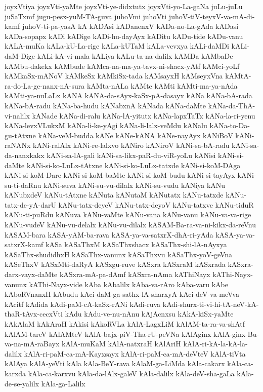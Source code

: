 {joyxVtiya
joyxVti-yaMte
joyxVti-ye-didxtutx
joyxVti-yo-La-gaNa
juLu-juLu
juSaTxmf
jugu-pesx-yuM-TA-guva
juhoVmi
juhoVti
juhoV-tiV-teyxV-va-mA-di-kamf
juhoV-ti-pa-yasA
kA
kADAsi
kADanenxV
kADa-no-La-gAda
kADasi
kADa-sopapx
kADi
kADige
kADi-hu-dayAyx
kADitu
kADu-tide
kADu-vanu
kALA-muKa
kALa-kU-La-rige
kALa-kUTaM
kALa-vevxya
kALi-daMDi
kALi-daM-Dige
kALi-kA-vi-mala
kALiya
kALu-ta-na-dalilx
kAMDa
kAMbaDe
kAMbu-dakekx
kAMbude
kAMca-na-ma-ya-tavx-ni-shacx-yAtf
kAMci-yoLf
kAMkaSx-mANoV
kAMkeSx
kAMkiSx-tada
kAMsayxH
kAMseyxVna
kAMtA-ra-do-La-ge-nanx-nA-sura
kAMta-nALa
kAMte
kAMti
kAMti-ma-ya-nAda
kAMti-ya-nuLaLx
kANA
kANA-da-sAyx-kaSx-pA-dasayx
kANa
kANa-bA-rada
kANa-bA-radu
kANa-ba-hudu
kANabxnA
kANada
kANa-daMte
kANa-da-ThA-vi-nalilx
kANade
kANa-di-ralu
kANa-lA-yitutx
kANa-lapxTaTx
kANa-la-ri-yenu
kANa-levxVLukxM
kANa-li-ke-yAgi
kANa-li-lalx-veMdu
kANalu
kANa-to-Da-gu-tAtxne
kANa-veM-budda
kANe
kANe-kANA
kANe-nayAyx
kANiBoV
kANi-raNANx
kANi-ralAlx
kANi-re-lalxvo
kANiro
kANiroV
kANi-sa-bA-radu
kANi-sa-da-nanxkakx
kANi-sa-lA-gali
kANi-sa-likx-paR-du-viR-yoLu
kANisi
kANi-si-daMte
kANi-si-ko-LuLx-tAtxne
kANi-si-ko-LuLx-tatxde
kANi-si-koM-DAga
kANi-si-koM-Dare
kANi-si-koM-baMte
kANi-si-koM-budu
kANi-si-tayAyx
kANi-su-ti-daRnu
kANi-suva
kANi-su-vu-dilalx
kANi-su-vudu
kANiya
kANu
kANubxdeV
kANu-tAtxne
kANuta
kANutaM
kANutatx
kANu-tatxde
kANu-tatx-de-yA-darU
kANu-tatx-deyeV
kANu-tatx-deyoV
kANu-tatxve
kANu-tiduR
kANu-ti-puRdu
kANuva
kANu-vaMte
kANu-vana
kANu-vanu
kANu-va-va-rige
kANu-vudeV
kANu-vu-delalx
kANu-vu-dilalx
kASAM-Ba-ra-va-ni-kikx-da-reVnu
kASAM-bara
kASA-yAM-ba-rava
kASA-ya-va-satxrX-dhA-ri-yAda
kASA-ya-va-satxrX-kamf
kASa
kASaThxM
kASaThxshacx
kASaThx-shi-lA-nAyxya
kASaThx-shudidhxH
kASaThx-vanunx
kASaThxvu
kASaThx-yoV-geVna
kASeThxV
kASxMti-daRyA
kASxgu-ruve
kASxra
kASxraM
kASxrada
kASxra-darx-vayx-daMte
kASxra-mA-pa-dAmf
kASxra-nAma
kAThiNayx
kAThi-Nayx-vanunx
kAThi-Nayx-vide
kAba
kAbalilx
kAba-va-rAro
kAba-varu
kAbe
kAboRVnanxH
kAbudu
kAci-daM-ga-sathx-lA-sharxyA
kAci-deV-va-meVva
kAcitf
kAdida
kAdi-paM-cA-kaSx-rANi
kAdi-ruva
kAdi-shurx-ti-vi-hi-tA-neV-kA-thaR-tAvx-cecxVti
kAdu
kAdu-ve-nu-nAnu
kAjAcnxsu
kAkA-kiSx-yaMte
kAkAlaM
kAkAraH
kAkisi
kAkoRVLa
kAlA-LagxLiM
kAlAM-ta-ra-va-shAtf
kAlAM-tareV
kAlAMteV
kAlA-bajx-piV-Tha-rU-peVNa
kAlAginx
kAlA-ginx-Bu-va-na-mA-raBayx
kAlA-muKaM
kAlA-natxraH
kAlAriH
kAlA-ri-kA-la-kA-la-dalilx
kAlA-ri-paM-ca-mA-Kayxsayx
kAlA-ri-paM-ca-mA-deVteV
kAlA-tiVta
kAlAya
kAlA-yeVti
kAla
kAla-BeY-rava
kAlaM-ga-LiMda
kAla-cakarx
kAla-ca-karxda
kAla-ca-karxvu
kAla-da-lAlx-galeV
kAla-dalilx
kAla-deV-sha-gaLa
kAla-de-se-yalilx
kAla-ga-Lalilx
}
